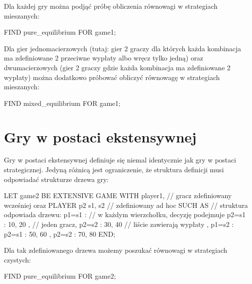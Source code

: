 \documentclass[polish]{standalone}
\begin{document}
Dla każdej gry można podjąć próbę obliczenia równowagi w strategiach mieszanych:

\begin{gtl}
FIND pure_equilibrium FOR game1;
\end{gtl}

Dla gier jednomacierzowych (tutaj: gier 2 graczy dla których każda kombinacja ma zdefiniowane 2 przeciwne wypłaty albo
wręcz tylko jedną) oraz dwumacierzowych (gier 2 graczy gdzie każda kombinacja ma zdefiniowane 2 wypłaty) można dodatkowo
próbować obliczyć równowagę w strategiach mieszanych:

\begin{gtl}
FIND mixed_equilibrium FOR game1;
\end{gtl}

\section{Gry w postaci ekstensywnej}

Gry w postaci ekstensywnej definiuje się niemal identycznie jak gry w postaci strategicznej. Jedyną różnicą jest
ograniczenie, że struktura definicji musi odpowiadać strukturze drzewa gry:

\begin{gtl}
LET game2 BE
  EXTENSIVE GAME
  WITH
    player1, // gracz zdefiniowany wcześniej oraz
    PLAYER p2 { s1, s2 } // zdefiniowany ad hoc
  SUCH AS      // struktura odpowiada drzewu:
    { p1=s1 :  // w każdym wierzchołku, decyzję podejmuje
      { p2=s1 : 10, 20 }, // jeden gracz,
      { p2=s2 : 30, 40 }  // liście zawierają wypłaty
    },
    { p1=s2 :
      { p2=s1 : 50, 60 },
      { p2=s2 : 70, 80 }
    }
  END;
\end{gtl}

Dla tak zdefiniowanego drzewa możemy poszukać równowagi w strategiach czystych:

\begin{gtl}
FIND pure_equilibrium FOR game2;
\end{gtl}
\end{document}
